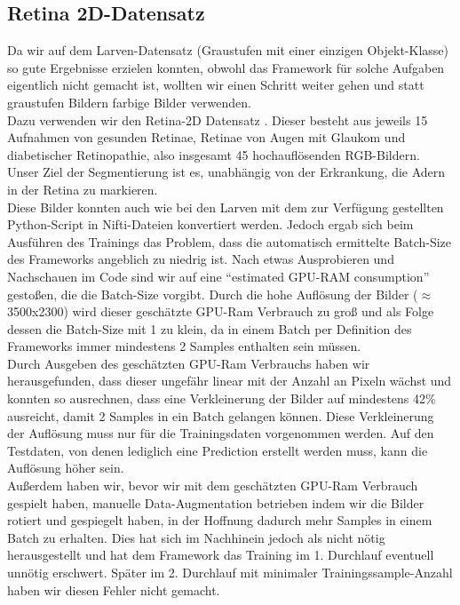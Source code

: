 \subsection{Retina 2D-Datensatz}
Da wir auf dem Larven-Datensatz (Graustufen mit einer einzigen Objekt-Klasse) so gute Ergebnisse erzielen konnten, obwohl das Framework für solche Aufgaben eigentlich nicht gemacht ist, wollten wir einen Schritt weiter gehen und statt graustufen Bildern farbige Bilder verwenden.\\
Dazu verwenden wir den Retina-2D Datensatz \cite{retina2d}. Dieser besteht aus jeweils 15 Aufnahmen von gesunden Retinae, Retinae von Augen mit Glaukom und diabetischer Retinopathie, also insgesamt 45 hochauflösenden RGB-Bildern. Unser Ziel der Segmentierung ist es, unabhängig von der Erkrankung, die Adern in der Retina zu markieren.\\
Diese Bilder konnten auch wie bei den Larven mit dem zur Verfügung gestellten Python-Script \cite{nnunetGithub2D-Pythonscript} in Nifti-Dateien konvertiert werden. Jedoch ergab sich beim Ausführen des Trainings das Problem, dass die automatisch ermittelte Batch-Size des Frameworks angeblich zu niedrig ist. Nach etwas Ausprobieren und Nachschauen im Code sind wir auf eine \enquote{estimated GPU-RAM consumption} \cite{nnunetGithub} gestoßen, die die Batch-Size vorgibt. Durch die hohe Auflösung der Bilder ($\approx$ 3500x2300) wird dieser geschätzte GPU-Ram Verbrauch zu groß und als Folge dessen die Batch-Size mit 1 zu klein, da in einem Batch per Definition des Frameworks immer mindestens 2 Samples enthalten sein müssen.\\
Durch Ausgeben des geschätzten GPU-Ram Verbrauchs haben wir herausgefunden, dass dieser ungefähr linear mit der Anzahl an Pixeln wächst und konnten so ausrechnen, dass eine Verkleinerung der Bilder auf mindestens 42\% ausreicht, damit 2 Samples in ein Batch gelangen können.
Diese Verkleinerung der Auflösung muss nur für die Trainingsdaten vorgenommen werden. Auf den Testdaten, von denen lediglich eine Prediction erstellt werden muss, kann die Auflösung höher sein.\\
Außerdem haben wir, bevor wir mit dem geschätzten GPU-Ram Verbrauch gespielt haben, manuelle Data-Augmentation betrieben indem wir die Bilder rotiert und gespiegelt haben, in der Hoffnung dadurch mehr Samples in einem Batch zu erhalten. Dies hat sich im Nachhinein jedoch als nicht nötig herausgestellt und hat dem Framework das Training im 1. Durchlauf eventuell unnötig erschwert. Später im 2. Durchlauf mit minimaler Trainingssample-Anzahl haben wir diesen Fehler nicht gemacht.
\\\\


